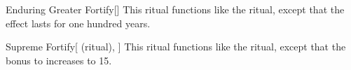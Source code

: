 \lowercase{\hypertarget{spell:Enduring Greater Fortify}{}}\label{spell:Enduring Greater Fortify}
\begin{apability}[Rank 5]{\hypertarget{spell:Enduring Greater Fortify}{Enduring Greater Fortify}}[]
This ritual functions like the  ritual, except that the effect lasts for one hundred years.
\end{apability}
\vspace{0.25em}



\lowercase{\hypertarget{spell:Supreme Fortify}{}}\label{spell:Supreme Fortify}
\begin{attuneability}[Rank 7]{\hypertarget{spell:Supreme Fortify}{Supreme Fortify}}[ (ritual), ]
This ritual functions like the  ritual, except that the bonus to  increases to 15.
\end{attuneability}
\vspace{0.25em}


